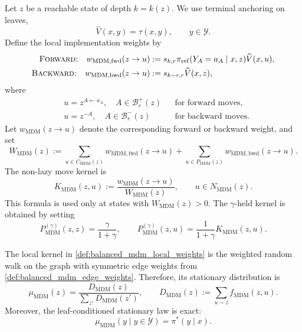\documentclass{article}
\numberwithin{theorem}{section}
\numberwithin{proposition}{section}
\numberwithin{corollary}{section}
\numberwithin{lemma}{section}
\numberwithin{conjecture}{section}
\numberwithin{remark}{section}
\numberwithin{definition}{section}
\numberwithin{assumption}{section}
\numberwithin{example}{section}
\newcommand{\calB}{{\mathcal{B}}}
\newcommand{\calY}{{\mathcal{Y}}}
\providecommand{\base}{\pi_{\mathrm{ref}}}
\begin{document}
\begin{definition}
\label{def:balanced_mdm_local_weights}
Let $z$ be a reachable state of depth $k=k(z)$. We use terminal anchoring on leaves,
\begin{equation*}
    \widehat V(x,y)=\tau(x,y),\qquad y\in\calY.
\end{equation*}
Define the local implementation weights by
\begin{align*}
    \textsc{Forward:}\quad
    w_{\mathrm{MDM,fwd}}(z\to u)&:=s_{k,r}\base(Y_A=a_A\mid x,z)\widehat V(x,u),\\
    \textsc{Backward:}\quad
    w_{\mathrm{MDM,bwd}}(z\to u)&:=s_{k-r,r}\widehat V(x,z),
\end{align*}
where
\begin{equation*}
    \begin{aligned}
        &u=z^{A\leftarrow a_A},\quad A\in\calB_r^+(z) &&\text{for forward moves},\\
        &u=z^{-A},\quad A\in\calB_r^-(z) &&\text{for backward moves}.
    \end{aligned}
\end{equation*}
Let $w_{\mathrm{MDM}}(z\to u)$ denote the corresponding forward or backward weight, and set
\begin{equation*}
    W_{\mathrm{MDM}}(z):=
    \sum_{u\in C_{\mathrm{MDM}}(z)}w_{\mathrm{MDM,fwd}}(z\to u)
    +
    \sum_{u\in P_{\mathrm{MDM}}(z)}w_{\mathrm{MDM,bwd}}(z\to u).
\end{equation*}
The non-lazy move kernel is
\begin{equation*}
    K_{\mathrm{MDM}}(z,u):=\frac{w_{\mathrm{MDM}}(z\to u)}{W_{\mathrm{MDM}}(z)},\qquad u\in N_{\mathrm{MDM}}(z).
\end{equation*}
This formula is used only at states with \(W_{\mathrm{MDM}}(z)>0\).
The $\gamma$-held kernel is obtained by setting
\begin{equation*}
    P_{\mathrm{MDM}}^{(\gamma)}(z,z)=\frac{\gamma}{1+\gamma},\qquad
    P_{\mathrm{MDM}}^{(\gamma)}(z,u)=\frac{1}{1+\gamma}K_{\mathrm{MDM}}(z,u).
\end{equation*}
\end{definition}

\begin{theorem}
\label{thm:balanced_mdm_weighted_graph}
The local kernel in \cref{def:balanced_mdm_local_weights} is the weighted random walk on the graph with symmetric edge weights from \cref{def:balanced_mdm_edge_weights}. Therefore, its stationary distribution is
\begin{equation*}
    \mu_{\mathrm{MDM}}(z)=\frac{D_{\mathrm{MDM}}(z)}{\sum_{z'}D_{\mathrm{MDM}}(z')},\qquad
    D_{\mathrm{MDM}}(z):=\sum_{u\sim z}f_{\mathrm{MDM}}(z,u).
\end{equation*}
Moreover, the leaf-conditioned stationary law is exact:
\begin{equation*}
    \mu_{\mathrm{MDM}}(y\mid y\in\calY)=\pi^*(y\mid x).
\end{equation*}
\end{theorem}
\end{document}
